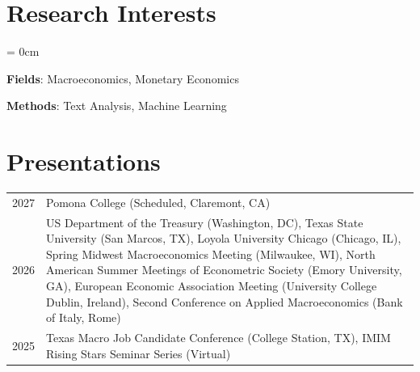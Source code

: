 \documentclass[a4paper, 10pt]{article}
\begin{document}
  \section{Research Interests}
  \begin{compactitem}\parskip = 0cm
    \item \textbf{Fields}: Macroeconomics, Monetary Economics
    \item \textbf{Methods}: Text Analysis, Machine Learning
  \end{compactitem}

  \begin{publications}
  \end{publications}

  \section{Presentations}
  \begin{tabular}{l p{14.3cm}}
    2027 & Pomona College (Scheduled, Claremont, CA)\\
    2026 & US Department of the Treasury (Washington, DC), Texas State University (San Marcos, TX), \newline Loyola University Chicago (Chicago, IL), Spring Midwest Macroeconomics Meeting (Milwaukee, \newline WI), North American Summer Meetings of Econometric Society (Emory University, GA), \newline European Economic Association Meeting (University College Dublin, Ireland), Second Conference \newline on Applied Macroeconomics (Bank of Italy, Rome)\\
    2025 & Texas Macro Job Candidate Conference (College Station, TX), IMIM Rising Stars Seminar Series \newline (Virtual)
  \end{tabular}
  
\end{document}
